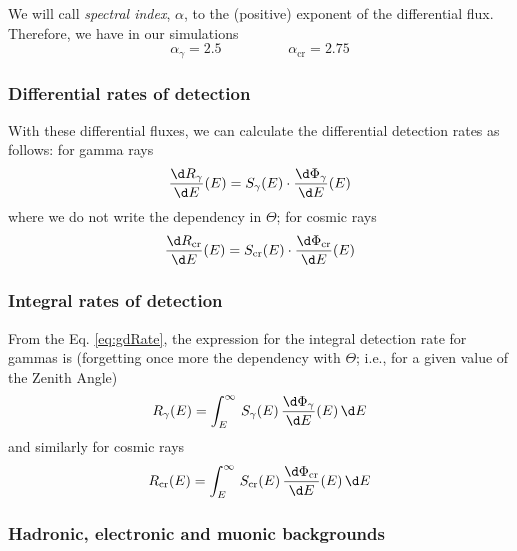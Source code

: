 We will call \emph{spectral index}, $\alpha$, to the (positive)
exponent of the differential flux. Therefore, we have in our
simulations
%
\begin{equation}
  \label{eq:alphas}
  \alpha_\gamma = 2.5 \hspace{2cm} \alpha_{\mathrm{cr}} = 2.75
\end{equation}

\subsubsection{Differential rates of detection}

With these differential fluxes, we can calculate the differential
detection rates as follows: for gamma rays
%
\begin{equation}
  \label{eq:gdRate}
  \frac{\d R_\gamma}{\d E}(E) = S_\gamma(E) \cdot
  \frac{\d\Phi_\gamma}{\d E}(E) 
\end{equation}
%
where we do not write the dependency in $\Theta$; for cosmic rays
%
\begin{equation}
  \label{eq:crdRate}
  \frac{\d R_{\mathrm{cr}}}{\d E}(E) = S_{\mathrm{cr}}(E) \cdot
  \frac{\d\Phi_{\mathrm{cr}}}{\d E}(E) 
\end{equation}


\subsubsection{Integral rates of detection}

From the Eq. \ref{eq:gdRate}, the expression for the integral
detection rate for gammas is (forgetting once more the dependency with
$\Theta$; i.e., for a given value of the Zenith Angle)
%
\begin{equation}
  \label{eq:gRate}
  R_\gamma(E) = \int_E^\infty \, 
  S_\gamma(E) \, \frac{\d\Phi_\gamma}{\d E}(E) \, \d E
\end{equation}
%
and similarly for cosmic rays
%
\begin{equation}
  \label{eq:crRate}
  R_{\mathrm{cr}}(E) = \int_E^\infty \,
  S_{\mathrm{cr}}(E) \, \frac{\d\Phi_{\mathrm{cr}}}{\d E}(E) \, \d E
\end{equation}


\subsubsection{Hadronic, electronic and muonic backgrounds}


\randpoifig



\endinput
%

%
%
%


